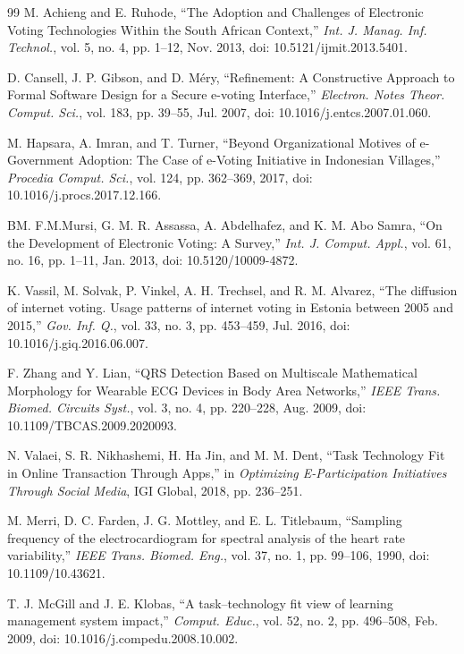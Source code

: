 \documentclass{iaesarticle}
\begin{document}
\begin{thebibliography} {99}
 M. Achieng and E. Ruhode, “The Adoption and Challenges of Electronic Voting Technologies Within the South African Context,” \textsl{Int. J. Manag. Inf. Technol.}, vol. 5, no. 4, pp. 1–12, Nov. 2013, doi: 10.5121/ijmit.2013.5401.

 D. Cansell, J. P. Gibson, and D. Méry, “Refinement: A Constructive Approach to Formal Software Design for a Secure e-voting Interface,” \textsl{Electron. Notes Theor. Comput. Sci.}, vol. 183, pp. 39–55, Jul. 2007, doi: 10.1016/j.entcs.2007.01.060.

 M. Hapsara, A. Imran, and T. Turner, “Beyond Organizational Motives of e-Government Adoption: The Case of e-Voting Initiative in Indonesian Villages,” \textsl{Procedia Comput. Sci.}, vol. 124, pp. 362–369, 2017, doi: 10.1016/j.procs.2017.12.166.

 BM. F.M.Mursi, G. M. R. Assassa, A. Abdelhafez, and K. M. Abo Samra, “On the Development of Electronic Voting: A Survey,” \textsl{Int. J. Comput. Appl.}, vol. 61, no. 16, pp. 1–11, Jan. 2013, doi: 10.5120/10009-4872.

 K. Vassil, M. Solvak, P. Vinkel, A. H. Trechsel, and R. M. Alvarez, “The diffusion of internet voting. Usage patterns of internet voting in Estonia between 2005 and 2015,” \textsl{Gov. Inf. Q.}, vol. 33, no. 3, pp. 453–459, Jul. 2016, doi: 10.1016/j.giq.2016.06.007.

 F. Zhang and Y. Lian, “QRS Detection Based on Multiscale Mathematical Morphology for Wearable ECG Devices in Body Area Networks,” \textsl{IEEE Trans. Biomed. Circuits Syst.}, vol. 3, no. 4, pp. 220–228, Aug. 2009, doi: 10.1109/TBCAS.2009.2020093.

 N. Valaei, S. R. Nikhashemi, H. Ha Jin, and M. M. Dent, “Task Technology Fit in Online Transaction Through Apps,” in \textsl{Optimizing E-Participation Initiatives Through Social Media}, IGI Global, 2018, pp. 236–251.

 M. Merri, D. C. Farden, J. G. Mottley, and E. L. Titlebaum, “Sampling frequency of the electrocardiogram for spectral analysis of the heart rate variability,” \textsl{IEEE Trans. Biomed. Eng.}, vol. 37, no. 1, pp. 99–106, 1990, doi: 10.1109/10.43621.

 T. J. McGill and J. E. Klobas, “A task–technology fit view of learning management system impact,” \textsl{Comput. Educ.}, vol. 52, no. 2, pp. 496–508, Feb. 2009, doi: 10.1016/j.compedu.2008.10.002.


\end{thebibliography}
\end{document}
